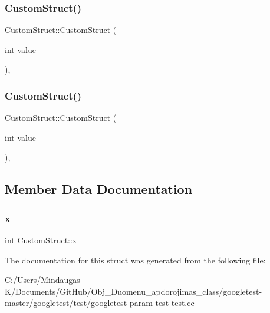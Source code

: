 \mbox{\label{struct_custom_struct_aeab194957ba9e056e81c721e83c61941}} 
\subsubsection{\texorpdfstring{CustomStruct()}{CustomStruct()}\hspace{0.1cm}{\footnotesize\ttfamily [2/3]}}
{\footnotesize\ttfamily Custom\+Struct\+::\+Custom\+Struct (\begin{DoxyParamCaption}\item[{int}]{value }\end{DoxyParamCaption})\hspace{0.3cm}{\ttfamily [inline]}, {\ttfamily [explicit]}}

\mbox{\label{struct_custom_struct_aeab194957ba9e056e81c721e83c61941}} 
\subsubsection{\texorpdfstring{CustomStruct()}{CustomStruct()}\hspace{0.1cm}{\footnotesize\ttfamily [3/3]}}
{\footnotesize\ttfamily Custom\+Struct\+::\+Custom\+Struct (\begin{DoxyParamCaption}\item[{int}]{value }\end{DoxyParamCaption})\hspace{0.3cm}{\ttfamily [inline]}, {\ttfamily [explicit]}}



\subsection{Member Data Documentation}
\mbox{\label{struct_custom_struct_a436b0c2ffdab1f711fa40cfa3e246602}} 
\subsubsection{\texorpdfstring{x}{x}}
{\footnotesize\ttfamily int Custom\+Struct\+::x}



The documentation for this struct was generated from the following file\+:\begin{DoxyCompactItemize}
\item 
C\+:/\+Users/\+Mindaugas K/\+Documents/\+Git\+Hub/\+Obj\+\_\+\+Duomenu\+\_\+apdorojimas\+\_\+class/googletest-\/master/googletest/test/\mbox{\hyperlink{googletest-master_2googletest_2test_2googletest-param-test-test_8cc}{googletest-\/param-\/test-\/test.\+cc}}\end{DoxyCompactItemize}
